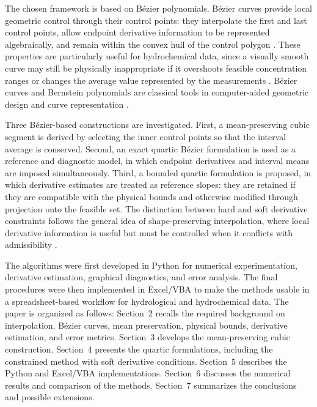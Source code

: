 \documentclass[12pt,a4paper]{article}
\begin{document}
The chosen framework is based on B\'ezier polynomials. B\'ezier curves provide local geometric control through their control points: they interpolate the first and last control points, allow endpoint derivative information to be represented algebraically, and remain within the convex hull of the control polygon \cite{farin2002curves,piegl1997nurbs,mitBezierProperties,aaltoBezier2013}. These properties are particularly useful for hydrochemical data, since a visually smooth curve may still be physically inappropriate if it overshoots feasible concentration ranges or changes the average value represented by the measurements \cite{kokhan2013geoinformation,piatkova2019dem}. B\'ezier curves and Bernstein polynomials are classical tools in computer-aided geometric design and curve representation \cite{farin2002curves,piegl1997nurbs,pomaxBezierPrimer}.

Three B\'ezier-based constructions are investigated. First, a mean-preserving cubic segment is derived by selecting the inner control points so that the interval average is conserved. Second, an exact quartic B\'ezier formulation is used as a reference and diagnostic model, in which endpoint derivatives and interval means are imposed simultaneously. Third, a bounded quartic formulation is proposed, in which derivative estimates are treated as reference slopes: they are retained if they are compatible with the physical bounds and otherwise modified through projection onto the feasible set. The distinction between hard and soft derivative constraints follows the general idea of shape-preserving interpolation, where local derivative information is useful but must be controlled when it conflicts with admissibility \cite{fritsch1980monotone,fritsch1984monotone}.

The algorithms were first developed in Python for numerical experimentation, derivative estimation, graphical diagnostics, and error analysis. The final procedures were then implemented in Excel/VBA to make the methods usable in a spreadsheet-based workflow for hydrological and hydrochemical data. The paper is organized as follows: Section~2 recalls the required background on interpolation, B\'ezier curves, mean preservation, physical bounds, derivative estimation, and error metrics. Section~3 develops the mean-preserving cubic construction. Section~4 presents the quartic formulations, including the constrained method with soft derivative conditions. Section~5 describes the Python and Excel/VBA implementations. Section~6 discusses the numerical results and comparison of the methods. Section~7 summarizes the conclusions and possible extensions.
\end{document}
